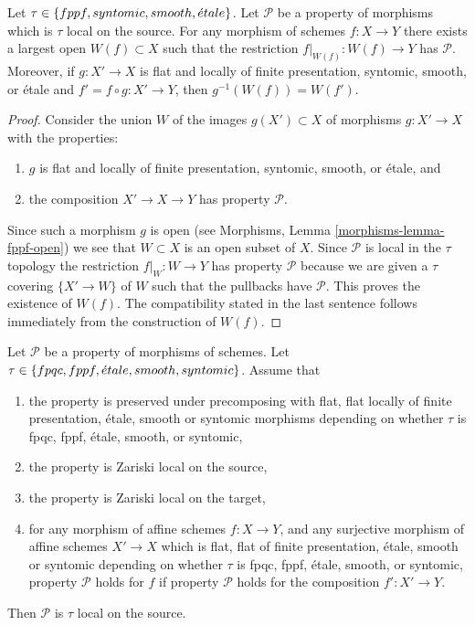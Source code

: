 \begin{lemma}
\label{lemma-largest-open-of-the-source}
Let $\tau \in \{fppf, syntomic, smooth, {\acute{e}tale}\}$.
Let $\mathcal{P}$ be a property of morphisms which is $\tau$ local
on the source. For any morphism of schemes $f : X \to Y$ there exists
a largest open $W(f) \subset X$ such that the restriction
$f|_{W(f)} : W(f) \to Y$ has $\mathcal{P}$. Moreover,
if $g : X' \to X$ is flat and locally of finite presentation,
syntomic, smooth, or \'etale and $f' = f \circ g : X' \to Y$, then
$g^{-1}(W(f)) = W(f')$.
\end{lemma}

\begin{proof}
Consider the union $W$ of the images $g(X') \subset X$ of
morphisms $g : X' \to X$ with the properties:
\begin{enumerate}
\item $g$ is flat and locally of finite presentation, syntomic,
smooth, or \'etale, and
\item the composition $X' \to X \to Y$ has property $\mathcal{P}$.
\end{enumerate}
Since such a morphism $g$ is open (see
Morphisms, Lemma \ref{morphisms-lemma-fppf-open})
we see that $W \subset X$ is an open subset of $X$. Since $\mathcal{P}$
is local in the $\tau$ topology the restriction $f|_W : W \to Y$ has property
$\mathcal{P}$ because we are given a $\tau$ covering $\{X' \to W\}$ of $W$
such that the pullbacks have $\mathcal{P}$. This proves the existence of $W(f)$.
The compatibility stated in the last sentence follows immediately
from the construction of $W(f)$.
\end{proof}

\begin{lemma}
\label{lemma-properties-morphisms-local-source}
Let $\mathcal{P}$ be a property of morphisms of schemes.
Let $\tau \in \{fpqc, \linebreak[0] fppf, \linebreak[0]
\etale, \linebreak[0] smooth, \linebreak[0] syntomic\}$.
Assume that
\begin{enumerate}
\item the property is preserved under precomposing with
flat, flat locally of finite presentation, \'etale, smooth or syntomic morphisms
depending on whether $\tau$ is fpqc, fppf, \'etale, smooth, or syntomic,
\item the property is Zariski local on the source,
\item the property is Zariski local on the target,
\item for any morphism of affine schemes $f : X \to Y$, and
any surjective morphism of affine schemes $X' \to X$
which is flat, flat of finite presentation,
\'etale, smooth or syntomic depending on whether $\tau$ is
fpqc, fppf, \'etale, smooth, or syntomic, property
$\mathcal{P}$ holds for $f$ if property $\mathcal{P}$
holds for the composition $f' : X' \to Y$.
\end{enumerate}
Then $\mathcal{P}$ is $\tau$ local on the source.
\end{lemma}

